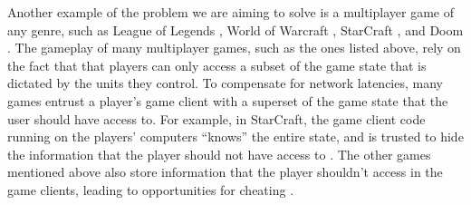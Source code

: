 Another example of the problem we are aiming to solve is a multiplayer game of
any genre, such as League of Legends \cite{riot2009lol},
World of Warcraft \cite{blizzard2004wow}, StarCraft \cite{blizzard2010sc2}, and
Doom \cite{id2004doom}. The gameplay of many multiplayer games, such as the
ones listed above, rely on the fact that that players can only access a subset
of the game state that is dictated by the units they control. To compensate for
network latencies, many games entrust a player's game client with a superset
of the game state that the user should have access to. For example, in
StarCraft, the game client code running on the players' computers ``knows'' the
entire state, and is trusted to hide the information that the player should not
have access to \cite{hardy2009cheating}. The other games mentioned above also
store information that the player shouldn't access in the game clients, leading
to opportunities for cheating \cite{youtube2013lolcheating}
\cite{youtube2008quake3cheating}.
